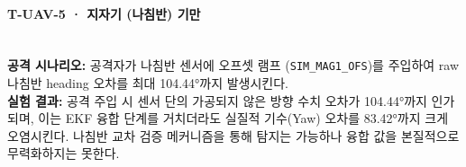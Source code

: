 \paragraph{\textbf{T-UAV-5 · 지자기 (나침반) 기만}} ~\\
\textbf{공격 시나리오:} 공격자가 나침반 센서에 오프셋 램프 (\texttt{SIM\_MAG1\_OFS})를 주입하여 raw 나침반 heading 오차를 최대 104.44°까지 발생시킨다.\\
\textbf{실험 결과:} 
공격 주입 시 센서 단의 가공되지 않은 방향 수치 오차가 104.44°까지 인가되며, 이는 EKF 융합 단계를 거치더라도 실질적 기수(Yaw) 오차를 83.42°까지 크게 오염시킨다. 나침반 교차 검증 메커니즘을 통해 탐지는 가능하나 융합 값을 본질적으로 무력화하지는 못한다.
\\
%
